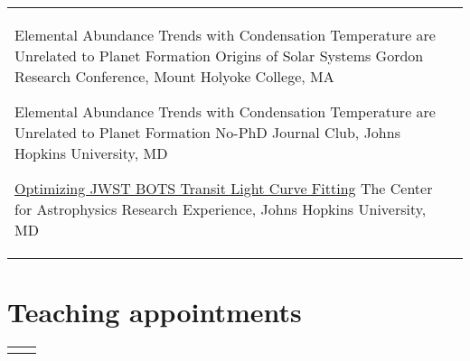 \documentclass[10pt]{article} %
\begin{document}

	
 \begin{supertabular}{L{4cm}@{\hskip 0.3in}L{13cm}}
	{{Elemental Abundance Trends with Condensation Temperature are Unrelated to Planet Formation}}
	{Origins of Solar Systems Gordon Research Conference, Mount Holyoke College, MA}

	{{Elemental Abundance Trends with Condensation Temperature are Unrelated to Planet Formation}}
	{No-PhD Journal Club, Johns Hopkins University, MD}

	{\href{https://sites.krieger.jhu.edu/jhu-care/summer-2022/}{Optimizing JWST BOTS Transit Light Curve Fitting}}
	{The Center for Astrophysics Research Experience, Johns Hopkins University, MD}
\end{supertabular}







	


\section{Teaching appointments} 
    \begin{supertabular}{L{4cm}@{\hskip 0.3in}L{13cm}}
    \end{supertabular}
\end{document}
